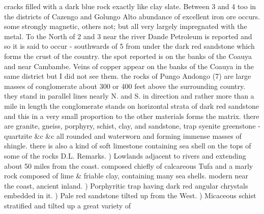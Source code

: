 \documentclass[11pt,twoside]{article}\makeatletter
\begin{document}
cracks filled with a dark blue rock exactly like clay slate. Between 3 and 4 too in the districts of Cazengo  \newline and Golungo Alto abundance of excellent iron ore occurs. some strongly magnetic, others not; but all very  \newline largely impregnated with the metal. To the North of 2 and 3 near the river Dande Petroleum is reported and  \newline so it is said to occur - southwards of 5 from under the dark red sandstone which forms the crust of the  \newline country. the spot reported is on the banks of the Coauya and near Cambambe. Veins of copper appear on  \newline the banks of the Coauya in the same district but I did not see them. the rocks of Pungo Andongo (7) are large  \newline masses of conglomerate about 300 or 400 feet above the surrounding country. they stand in parallel lines nearly  \newline N. and S. in direction and rather more than a mile in length the conglomerate stands on horizontal strata of dark red  \newline sandstone and this in a very small proportion to the other materials forms the matrix. there are granite, gneiss, porphyry,  \newline schist, clay, and sandstone, trap syenite greenstone - quartzite \&c \&c all rounded and waterworn and forming immense  \newline masses of shingle. there is also a kind of soft limestone containing sea shell on the tops of some of the rocks D.L. \newline  \indent Remarks.  ) Lowlands adjacent  \newline to rivers and extending  \newline about 50 miles from  \newline the coast. composed  \newline chiefly of calcareous  \newline Tufa and a marly  \newline rock composed of lime \&  \newline friable clay, containing  \newline many sea shells. modern  \newline near the coast, ancient inland.\label{p9r-01} \newline  {}) Porphyritic trap  \newline having dark red angular  \newline chrystals embedded in it.  ) Pale red sandstone  \newline tilted up from the West.  ) Micaceous schist  \newline stratified and tilted up  \newline a great variety of  
\end{document}
